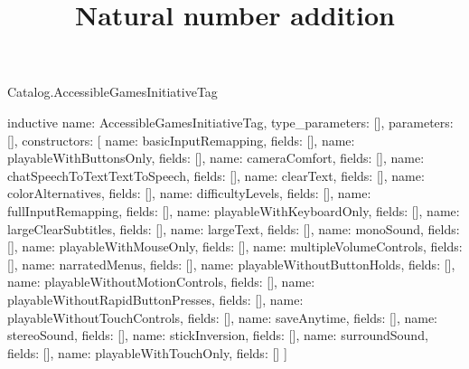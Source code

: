 \begin{lexlean}{Catalog.AccessibleGamesInitiativeTag}
\title{Natural number addition}
\begin{semanticmodule}
inductive{
  name: AccessibleGamesInitiativeTag,
  type_parameters: [],
  parameters: [],
  constructors: [
    {name: basicInputRemapping, fields: []},
    {name: playableWithButtonsOnly, fields: []},
    {name: cameraComfort, fields: []},
    {name: chatSpeechToTextTextToSpeech, fields: []},
    {name: clearText, fields: []},
    {name: colorAlternatives, fields: []},
    {name: difficultyLevels, fields: []},
    {name: fullInputRemapping, fields: []},
    {name: playableWithKeyboardOnly, fields: []},
    {name: largeClearSubtitles, fields: []},
    {name: largeText, fields: []},
    {name: monoSound, fields: []},
    {name: playableWithMouseOnly, fields: []},
    {name: multipleVolumeControls, fields: []},
    {name: narratedMenus, fields: []},
    {name: playableWithoutButtonHolds, fields: []},
    {name: playableWithoutMotionControls, fields: []},
    {name: playableWithoutRapidButtonPresses, fields: []},
    {name: playableWithoutTouchControls, fields: []},
    {name: saveAnytime, fields: []},
    {name: stereoSound, fields: []},
    {name: stickInversion, fields: []},
    {name: surroundSound, fields: []},
    {name: playableWithTouchOnly, fields: []}
  ]
}
\end{semanticmodule}
\end{lexlean}
